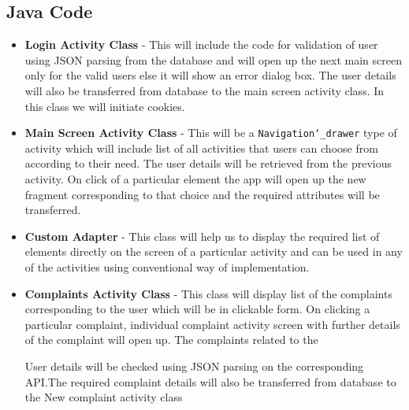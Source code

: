 \documentclass[a4paper]{article}
\begin{document}
\subsection{Java Code}
\begin{itemize}



\item \textbf{Login Activity Class} - This will include the code for validation of user using JSON parsing from the database and will open up the next main screen only for the valid users else it will show an error dialog box. The user details will also be transferred from database to the main screen activity class. In this class we will initiate cookies.
\item \textbf{Main Screen Activity Class} - This will be a \texttt{Navigation\char`_drawer} type of activity which will include list of all activities that users can choose from according to their need. The user details will be retrieved from the previous activity. On click of a particular element the app will open up the new fragment corresponding to that choice and the required attributes will be transferred.
\item \textbf{Custom Adapter} - This class will help us to display the required list of elements directly on the screen of a particular activity and can be used in any of the activities using conventional way of implementation.
\item	\textbf{Complaints Activity Class} - This class will display list of the complaints corresponding to the user which will be in clickable form. On clicking a particular complaint, individual complaint activity screen with further details of the complaint will open up. The complaints related to the

User details will be checked using JSON parsing on the corresponding API.The required complaint details will also be transferred from database to the New complaint activity class


\end{itemize}
\end{document}
